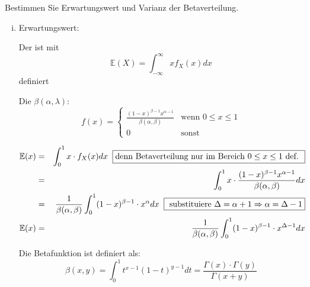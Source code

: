 \begin{uebsp}
\begin{Exercise}[label=ex:3.3]
Bestimmen Sie Erwartungswert und Varianz der Betaverteilung.
\end{Exercise}
\begin{Answer}
    \begin{enumerate}[i)]
        \item Erwartungswert:
            \begin{uebsp_theory}
                Der  ist mit 
                    \[\mathbb E(X)=\int_{-\infty}^\infty xf_X(x)dx\]
                definiert
            \end{uebsp_theory}

            \begin{uebsp_theory}
                Die  $\beta(\alpha, \lambda)$: 
                    \[f(x) = \begin{cases} 
                                \frac{(1-x)^{\beta-1} x^{\alpha-1}}{\beta(\alpha, \beta)} &\mbox{wenn } 0\leq x \leq 1 \\
                                0 & \mbox{sonst}
                                \end{cases}\]
            \end{uebsp_theory}
            \begin{eqnarray*}
                \mathbb{E}(x) &=& \int_0^1 x\cdot f_X(x)dx\;\;\fbox{denn Betaverteilung nur im Bereich $0\leq x\leq1$ def. } \\
                 &=& \int_0^1 x\cdot \frac{(1-x)^{\beta-1} x^{\alpha-1}}{\beta(\alpha, \beta)}dx\\
                 &=& \frac{1}{\beta(\alpha, \beta)} \int_0^1 (1-x)^{\beta-1} \cdot x^{\alpha}dx\;\;\fbox{ substituiere $\Delta=\alpha+1\Rightarrow\alpha=\Delta-1$}\\
                \mathbb{E}(x) &=& \frac{1}{\beta(\alpha, \beta)} \int_0^1 (1-x)^{\beta-1} \cdot x^{\Delta-1}dx
            \end{eqnarray*}

            \begin{uebsp_theory}
                Die Betafunktion ist definiert als:
                \[\beta(x,y)=\int_0^1t^{x-1}(1-t)^{y-1}dt=\frac{\Gamma(x)\cdot\Gamma(y)}{\Gamma(x+y)}\]
            \end{uebsp_theory}


\end{enumerate}
\end{Answer}
\end{uebsp}

